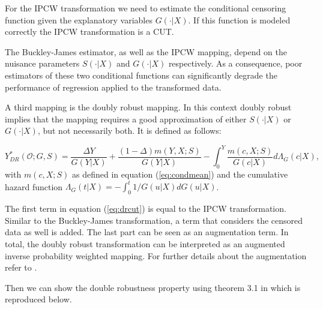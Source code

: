 \documentclass[12pt, a4paper]{scrartcl}
\theoremstyle{definition}
\theoremstyle{plain}
\numberwithin{equation}{section}
\numberwithin{figure}{section}
\numberwithin{table}{section}
\begin{document}
	For the IPCW transformation we need to estimate the conditional censoring function given the explanatory variables $G(\cdot\vert X)$.
	If this function is modeled correctly the IPCW transformation is a CUT.
	
	
	

	The Buckley-James estimator, as well as the IPCW mapping, depend on the nuisance parameters $S(\cdot\vert X)$ and $G(\cdot\vert X)$ respectively.
	As a consequence, poor estimators of these two conditional functions can significantly degrade the performance of regression applied to the transformed data.
	
	A third mapping is the doubly robust mapping.
	In this context doubly robust implies that the mapping requires a good approximation of either  $S(\cdot\vert X)$ or $G(\cdot\vert X)$, but not necessarily both.
	It is defined as follows:
	
	\begin{equation}\label{eq:drcut}
	Y_{DR}^* (\mathcal{O}; G, S) = \frac{\Delta Y}{G(Y\vert X)} + \frac{(1-\Delta)m(Y,X;S)}{G(Y \vert X)} - \int_{0}^{Y} \frac{m(c,X;S)}{G(c \vert X)} d\Lambda_G(c \vert X),
	\end{equation}
	with $m(c,X;S)$ as defined in equation (\ref{eq:condmean}) and the cumulative hazard function $\Lambda_G(t\vert X)=-\int_{0}^{t}1/G(u\vert X)dG(u\vert X)$.
	
	The first term in equation (\ref{eq:drcut}) is equal to the IPCW transformation.
	Similar to the Buckley-James transformation, a term that considers the censored data as well is added.
	The last part can be seen as an augmentation term.
	In total, the doubly robust transformation can be interpreted as an augmented inverse probability weighted mapping.
	For further details about the augmentation refer to \citet*{bookfailuretime}.
		
	Then we can show the double robustness property using theorem 3.1 in \citet*{drcut} which is reproduced below.
	
\end{document}
